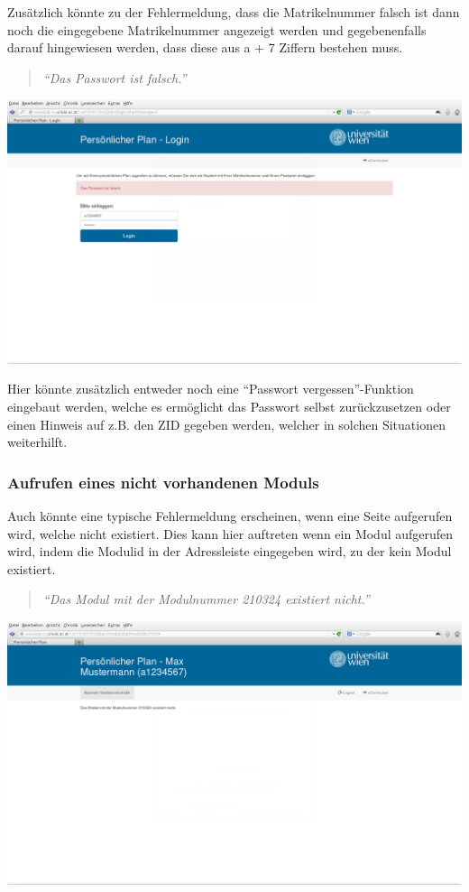 \documentclass[a4paper,10pt]{scrartcl}
\begin{document}
Zusätzlich könnte zu der Fehlermeldung, dass die Matrikelnummer falsch ist dann noch die eingegebene Matrikelnummer angezeigt werden und gegebenenfalls darauf hingewiesen
werden, dass diese aus a + 7 Ziffern bestehen muss.

\begin{quote}
 \textit{``Das Passwort ist falsch.''}
\end{quote} 

\begin{center}
 \includegraphics[scale=0.4]{./fehlermeldung3.png}
\end{center}

Hier könnte zusätzlich entweder noch eine ``Passwort vergessen''-Funktion eingebaut werden, welche es ermöglicht das Passwort selbst zurückzusetzen oder einen
Hinweis auf z.B. den ZID gegeben werden, welcher in solchen Situationen weiterhilft.

\subsubsection*{Aufrufen eines nicht vorhandenen Moduls}

Auch könnte eine typische Fehlermeldung erscheinen, wenn eine Seite aufgerufen wird, welche nicht existiert. Dies kann hier auftreten wenn ein Modul aufgerufen wird, indem die Modulid in der Adressleiste
eingegeben wird, zu der kein Modul existiert.

\begin{quote}
 \textit{``Das Modul mit der Modulnummer 210324 existiert nicht.''}
\end{quote} 

\begin{center}
 \includegraphics[scale=0.4]{./fehlermeldung4.png}
\end{center}
\end{document}
